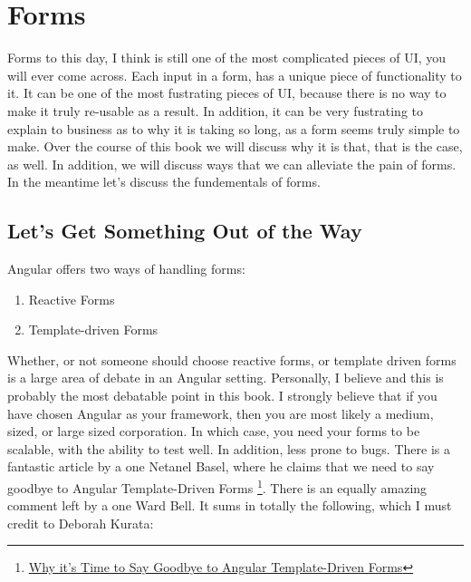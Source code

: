 \maketitle{}
\section{ Forms }

Forms to this day, I think is still one of the most complicated pieces of UI,
you will ever come across. Each input in a form, has a unique piece of 
functionality to it. It can be one of the most fustrating pieces of UI, 
because there is no way to make it truly re-usable as a result. In 
addition, it can be very fustrating to explain to business as to why it is 
taking so long, as a form seems truly simple to make. Over the course of this 
book we will discuss why it is that, that is the case, as well. In addition,
we will discuss ways that we can alleviate the pain of forms. In the meantime 
let's discuss the fundementals of forms. 

\subsection{ Let's Get Something Out of the Way }

Angular offers two ways of handling forms: 
\begin{enumerate}
  \item Reactive Forms 
  \item Template-driven Forms
\end{enumerate}

Whether, or not someone should choose reactive forms, or template driven 
forms is a large area of debate in an Angular setting. Personally, I believe 
and this is probably the most debatable point in this book. I strongly 
believe that if you have chosen Angular as your framework, then you are most 
likely a medium, sized, or large sized corporation. In which case, you need 
your forms to be scalable, with the ability to test well. In addition, less 
prone to bugs. There is a fantastic article by a one Netanel Basel, where 
he claims that we need to say goodbye to Angular Template-Driven Forms
\footnote{\href{https://netbasal.com/why-its-time-to-say-goodbye-to-angular-template-driven-forms-350c11d004b}{Why it's Time to Say Goodbye to Angular Template-Driven Forms}}.
There is an equally amazing comment left by a one Ward Bell. It sums in totally the 
following, which I must credit to Deborah Kurata: 

